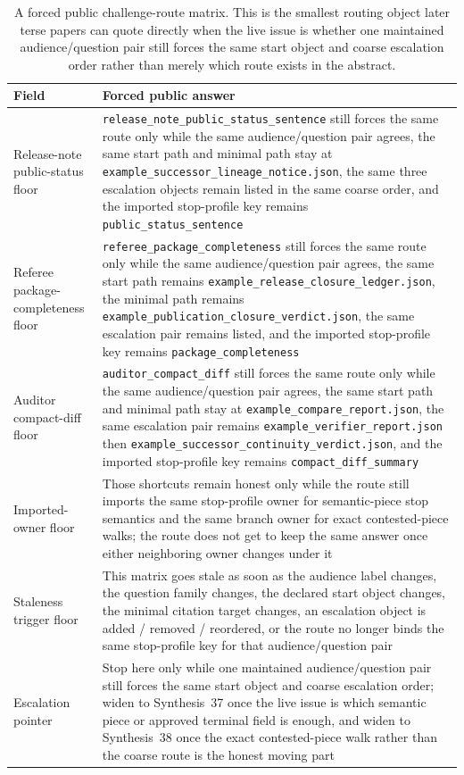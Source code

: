 \documentclass[11pt]{article}
\begin{document}
\begin{table}[t]
\centering
\small
\begin{tabularx}{\linewidth}{@{}lX@{}}
\toprule
Field & Forced public answer \\
\midrule
Release-note public-status floor & \nolinkurl{release_note_public_status_sentence} still forces the same route only while the same audience/question pair agrees, the same start path and minimal path stay at \nolinkurl{example_successor_lineage_notice.json}, the same three escalation objects remain listed in the same coarse order, and the imported stop-profile key remains \nolinkurl{public_status_sentence} \\
Referee package-completeness floor & \nolinkurl{referee_package_completeness} still forces the same route only while the same audience/question pair agrees, the same start path remains \nolinkurl{example_release_closure_ledger.json}, the minimal path remains \nolinkurl{example_publication_closure_verdict.json}, the same escalation pair remains listed, and the imported stop-profile key remains \nolinkurl{package_completeness} \\
Auditor compact-diff floor & \nolinkurl{auditor_compact_diff} still forces the same route only while the same audience/question pair agrees, the same start path and minimal path stay at \nolinkurl{example_compare_report.json}, the same escalation pair remains \nolinkurl{example_verifier_report.json} then \nolinkurl{example_successor_continuity_verdict.json}, and the imported stop-profile key remains \nolinkurl{compact_diff_summary} \\
Imported-owner floor & Those shortcuts remain honest only while the route still imports the same stop-profile owner for semantic-piece stop semantics and the same branch owner for exact contested-piece walks; the route does not get to keep the same answer once either neighboring owner changes under it \\
Staleness trigger floor & This matrix goes stale as soon as the audience label changes, the question family changes, the declared start object changes, the minimal citation target changes, an escalation object is added / removed / reordered, or the route no longer binds the same stop-profile key for that audience/question pair \\
Escalation pointer & Stop here only while one maintained audience/question pair still forces the same start object and coarse escalation order; widen to Synthesis~37 once the live issue is which semantic piece or approved terminal field is enough, and widen to Synthesis~38 once the exact contested-piece walk rather than the coarse route is the honest moving part \\
\bottomrule
\end{tabularx}
\caption{A forced public challenge-route matrix. This is the smallest routing object later terse papers can quote directly when the live issue is whether one maintained audience/question pair still forces the same start object and coarse escalation order rather than merely which route exists in the abstract.}
\label{tab:forced-public-challenge-route-matrix}
\end{table}
\end{document}
